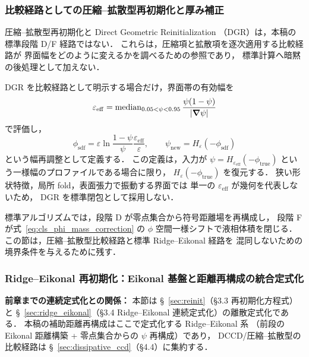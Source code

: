 \subsubsection{比較経路としての圧縮--拡散型再初期化と厚み補正}
\label{sec:dgr_thickness}

圧縮--拡散型再初期化と Direct Geometric Reinitialization
（DGR）は，本稿の標準段階 D/F 経路ではない．
これらは，圧縮項と拡散項を逐次適用する比較経路が
界面幅をどのように変えるかを調べるための参照であり，
標準計算へ暗黙の後処理として加えない．

DGR を比較経路として明示する場合だけ，界面帯の有効幅を
\begin{equation}
  \varepsilon_{\mathrm{eff}}
  =
  \operatorname{median}_{0.05<\psi<0.95}
  \frac{\psi(1-\psi)}{|\bm{\nabla}\psi|}
  \label{eq:dgr_effective_width}
\end{equation}
で評価し，
\begin{equation}
  \phi_{\mathrm{sdf}}
  =
  \varepsilon\ln\frac{1-\psi}{\psi}
  \frac{\varepsilon_{\mathrm{eff}}}{\varepsilon},
  \qquad
  \psi_{\mathrm{new}}=H_\varepsilon(-\phi_{\mathrm{sdf}})
  \label{eq:dgr_width_rescale}
\end{equation}
という幅再調整として定義する．
この定義は，入力が
$\psi=H_{\varepsilon_{\mathrm{eff}}}(-\phi_{\mathrm{true}})$
という一様幅のプロファイルである場合に限り，
$H_\varepsilon(-\phi_{\mathrm{true}})$ を復元する．
狭い形状特徴，局所 fold，表面張力で振動する界面では
単一の $\varepsilon_{\mathrm{eff}}$ が幾何を代表しないため，
DGR を標準閉包として採用しない．

標準アルゴリズムでは，段階 D が零点集合から符号距離場を再構成し，
段階 F が式~\eqref{eq:cls_phi_mass_correction} の
$\phi$ 空間一様シフトで液相体積を閉じる．
この節は，圧縮--拡散型比較経路と標準 Ridge--Eikonal 経路を
混同しないための境界条件を与えるために残す．


\subsubsection{Ridge--Eikonal 再初期化：Eikonal 基盤と距離再構成の統合定式化}
\label{sec:xi_sdf_reinit}
\label{sec:eikonal_reinit}%

\noindent\textbf{前章までの連続定式化との関係：}
本節は §~\ref{sec:reinit}（§3.3 再初期化方程式）と
§~\ref{sec:ridge_eikonal}（§3.4 Ridge--Eikonal 連続定式化）の離散定式化である．
本稿の補助距離再構成はここで定式化する Ridge--Eikonal 系
（前段の Eikonal 距離構築 + 零点集合からの $\psi$ 再構成）であり，
DCCD/圧縮--拡散型の比較経路は §~\ref{sec:dissipative_ccd}（§4.4）に集約する．

